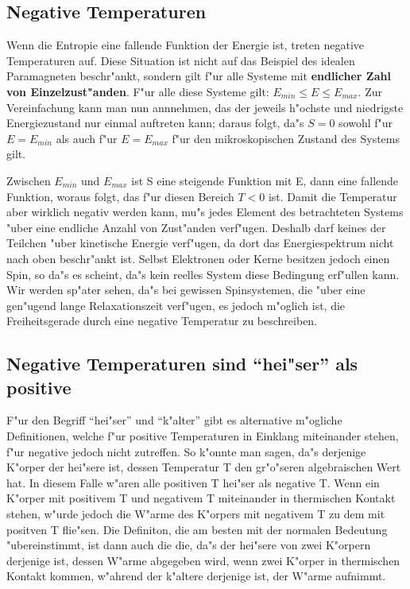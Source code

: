 \documentclass[12pt]{article}
\begin{document}
\begin{module}[id=mytemparature,uses=probability-intro]
\section{Negative Temperaturen}

Wenn die Entropie eine fallende Funktion der Energie ist, treten negative
Temperaturen auf. Diese Situation ist nicht auf das Beispiel des idealen
Paramagneten beschr"ankt, sondern gilt f"ur alle Systeme mit
{\bf endlicher Zahl von Einzelzust"anden}. 
F"ur alle diese Systeme gilt: $E_{min}\leq E \leq E_{max}$. Zur Vereinfachung
kann man nun annnehmen, das der jeweils h"ochste und niedrigste Energiezustand
nur einmal auftreten kann; daraus folgt, da"s $S=0$ sowohl f"ur $E=E_{min}$ als
auch f"ur $E=E_{max}$ f"ur den mikroskopischen Zustand des Systems gilt.

Zwischen $E_{min}$ und $E_{max}$ ist S eine steigende Funktion mit E,
dann eine fallende Funktion,
woraus folgt, das f"ur diesen Bereich $T<0$ ist. 
Damit die Temperatur aber wirklich negativ werden kann, mu"s jedes Element
des betrachteten Systems "uber eine endliche Anzahl von Zust"anden verf"ugen.
Deshalb darf keines der Teilchen "uber kinetische Energie verf"ugen, da dort
das Energiespektrum nicht nach oben beschr"ankt ist.
Selbst Elektronen oder Kerne besitzen jedoch einen Spin, so da"s es scheint,
da"s kein reelles System diese Bedingung erf"ullen kann.
Wir werden sp"ater sehen, da"s bei gewissen Spinsystemen, die "uber eine
gen"ugend lange Relaxationszeit verf"ugen, es jedoch m"oglich ist,
die Freiheitsgerade durch eine negative Temperatur zu beschreiben.

\subsection{Negative Temperaturen sind ``hei"ser'' als positive}

F"ur den Begriff ``hei"ser'' und ``k"alter'' gibt es alternative m"ogliche
Definitionen, welche f"ur positive Temperaturen in Einklang miteinander
stehen, f"ur negative jedoch nicht zutreffen.
So k"onnte man sagen, da"s derjenige K"orper der hei"sere ist, dessen 
Temperatur T den gr"o"seren algebraischen Wert hat. In diesem Falle w"aren
alle positiven T hei"ser als negative T.
Wenn ein K"orper mit positivem T und negativem T miteinander in thermischen
Kontakt stehen, w"urde jedoch die W"arme des K"orpers mit negativem T
zu dem mit positven T flie"sen.
Die Definiton, die am besten mit der normalen Bedeutung "ubereinstimmt,
ist dann auch die die, da"s der hei"sere von zwei K"orpern derjenige ist,
dessen W"arme abgegeben wird, wenn zwei K"orper in thermischen Kontakt 
kommen, w"ahrend der k"altere derjenige ist, der W"arme aufnimmt.


\end{module}
\end{document}
